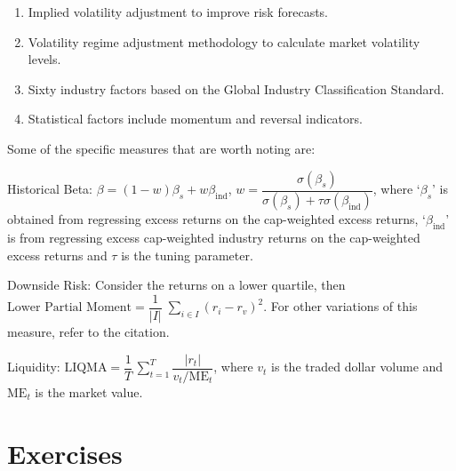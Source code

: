 \begin{enumerate}[--]
\item Implied volatility adjustment to improve risk forecasts.
\item Volatility regime adjustment methodology to calculate market volatility levels.
\item Sixty industry factors based on the Global Industry Classification Standard.
\item Statistical factors include momentum and reversal indicators. 
\end{enumerate}


Some of the specific measures that are worth noting are: \twomedskip

\noindent Historical Beta: $\beta= (1-w) \beta_s + w \beta_{\text{ind}}$, $w= \dfrac{\sigma(\beta_s)}{\sigma(\beta_s) + \tau \sigma(\beta_{\text{ind}})}$, where `$\beta_s$' is obtained from regressing excess returns on the cap-weighted excess returns, `$\beta_{\text{ind}}$' is from regressing excess cap-weighted industry returns on the cap-weighted excess returns and $\tau$ is the tuning parameter. \twomedskip


\noindent Downside Risk: Consider the returns on a lower quartile, then $\text{Lower Partial Moment}= \dfrac{1}{\lvert I \rvert} \; \sum_{i \in I} (r_i - r_v)^2$. For other variations of this measure, refer to the citation. \twomedskip


\noindent Liquidity: $\text{LIQMA}= \dfrac{1}{T} \, \sum_{t=1}^T \dfrac{\lvert r_t \rvert}{v_t/\text{ME}_t}$, where $v_t$ is the traded dollar volume and $\text{ME}_t$ is the market value. 



\section{Exercises}

